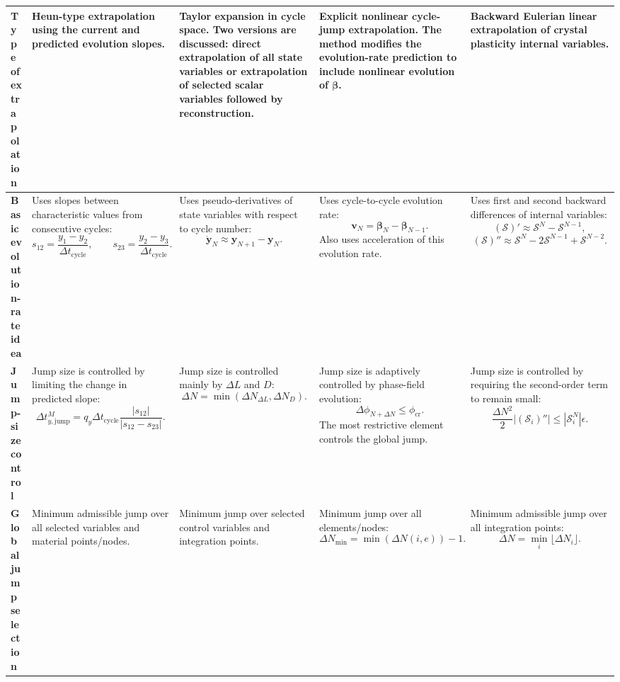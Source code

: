 ﻿\documentclass[11pt,a4paper]{article}
\begin{document}
\begin{landscape}
\begin{table}[htbp]
\begin{tabularx}{\linewidth}{p{3.1cm} Y Y Y Y}
\midrule

\textbf{Type of extrapolation}
&
Heun-type extrapolation using the current and predicted evolution slopes.
&
Taylor expansion in cycle space. Two versions are discussed: direct extrapolation of all state variables or extrapolation of selected scalar variables followed by reconstruction.
&
Explicit nonlinear cycle-jump extrapolation. The method modifies the evolution-rate prediction to include nonlinear evolution of $\bm{\beta}$.
&
Backward Eulerian linear extrapolation of crystal plasticity internal variables.
\\

\midrule

\textbf{Basic evolution-rate idea}
&
Uses slopes between characteristic values from consecutive cycles:
\[
s_{12}=\frac{y_1-y_2}{\Delta t_{\mathrm{cycle}}},
\qquad
s_{23}=\frac{y_2-y_3}{\Delta t_{\mathrm{cycle}}}.
\]
&
Uses pseudo-derivatives of state variables with respect to cycle number:
\[
\dot{\bm{y}}_N \approx \bm{y}_{N+1}-\bm{y}_N.
\]
&
Uses cycle-to-cycle evolution rate:
\[
\bm{v}_N=\bm{\beta}_N-\bm{\beta}_{N-1}.
\]
Also uses acceleration of this evolution rate.
&
Uses first and second backward differences of internal variables:
\[
(\bm{\mathcal{S}})' \approx \bm{\mathcal{S}}^N-\bm{\mathcal{S}}^{N-1},
\]
\[
(\bm{\mathcal{S}})'' \approx \bm{\mathcal{S}}^N-2\bm{\mathcal{S}}^{N-1}+\bm{\mathcal{S}}^{N-2}.
\]
\\

\midrule

\textbf{Jump-size control}
&
Jump size is controlled by limiting the change in predicted slope:
\[
\Delta t^M_{y,\mathrm{jump}}
=
q_y\Delta t_{\mathrm{cycle}}
\frac{|s_{12}|}{|s_{12}-s_{23}|}.
\]
&
Jump size is controlled mainly by $\Delta L$ and $D$:
\[
\Delta N=\min(\Delta N_{\Delta L},\Delta N_D).
\]
&
Jump size is adaptively controlled by phase-field evolution:
\[
\Delta \phi_{N+\Delta N}\leq \phi_{\mathrm{cr}}.
\]
The most restrictive element controls the global jump.
&
Jump size is controlled by requiring the second-order term to remain small:
\[
\frac{\Delta N^2}{2}|(\bm{\mathcal{S}}_i)''|
\leq
|\bm{\mathcal{S}}_i^N|\epsilon.
\]
\\

\midrule

\textbf{Global jump selection}
&
Minimum admissible jump over all selected variables and material points/nodes.
&
Minimum jump over selected control variables and integration points.
&
Minimum jump over all elements/nodes:
\[
\Delta N_{\min}=\min(\Delta N(i,e))-1.
\]
&
Minimum admissible jump over all integration points:
\[
\Delta N=\min_i \lfloor \Delta N_i \rfloor.
\]
\\


\end{tabularx}
\end{table}
\end{landscape}
\end{document}
